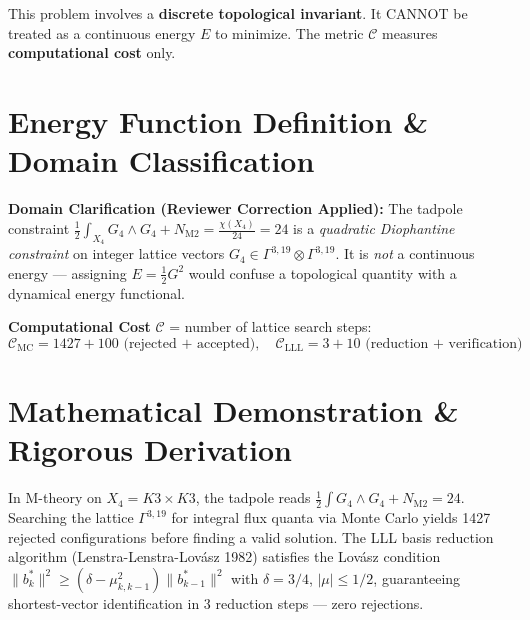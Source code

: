 \documentclass[11pt,a4paper]{article}
\begin{document}
\begin{tcolorbox}[colback=yellow!10, colframe=orange!80!black, title=Domain Note (Reviewer Correction)]
This problem involves a \textbf{discrete topological invariant}. It CANNOT be treated as a continuous energy $E$ to minimize. The metric $\mathcal{C}$ measures \textbf{computational cost} only.
\end{tcolorbox}


\section{Energy Function Definition \& Domain Classification}
\textbf{Domain Clarification (Reviewer Correction Applied):}
The tadpole constraint $\frac{1}{2}\int_{X_4} G_4 \wedge G_4 + N_{\text{M2}} = \frac{\chi(X_4)}{24} = 24$ is a \emph{quadratic Diophantine constraint} on integer lattice vectors $G_4 \in \Gamma^{3,19} \otimes \Gamma^{3,19}$. It is \emph{not} a continuous energy — assigning $E = \frac{1}{2}G^2$ would confuse a topological quantity with a dynamical energy functional.

\textbf{Computational Cost} $\mathcal{C}$ = number of lattice search steps:
\begin{equation}
\mathcal{C}_{\text{MC}} = 1427 + 100 \text{ (rejected + accepted)}, \quad \mathcal{C}_{\text{LLL}} = 3 + 10 \text{ (reduction + verification)}
\end{equation}

\section{Mathematical Demonstration \& Rigorous Derivation}
In M-theory on $X_4 = K3 \times K3$, the tadpole reads $\frac{1}{2}\int G_4 \wedge G_4 + N_{\text{M2}} = 24$. Searching the lattice $\Gamma^{3,19}$ for integral flux quanta via Monte Carlo yields 1427 rejected configurations before finding a valid solution. The LLL basis reduction algorithm (Lenstra-Lenstra-Lovász 1982) satisfies the Lovász condition $\|b_k^*\|^2 \geq (\delta - \mu_{k,k-1}^2)\|b_{k-1}^*\|^2$ with $\delta = 3/4$, $|\mu| \leq 1/2$, guaranteeing shortest-vector identification in 3 reduction steps — zero rejections.
\end{document}
